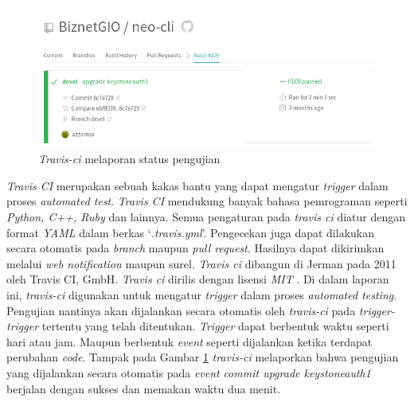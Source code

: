 \begin{figure}[H]
  \centering
  \includegraphics[width=.8\linewidth]{img/travis-head}
  \caption{\emph{Travis-ci} melaporan status pengujian}
  \label{fig:travis-head}
\end{figure}

\emph{Travis CI} merupakan sebuah kakas bantu yang dapat mengatur
\emph{trigger} dalam proses \emph{automated test}.  \emph{Travis CI}
mendukung banyak bahasa pemrograman seperti \emph{Python, C++, Ruby}
dan lainnya. Semua pengaturan pada \emph{travis ci} diatur dengan
format \emph{YAML} dalam berkas `\emph{.travis.yml}'. Pengecekan juga
dapat dilakukan secara otomatis pada \emph{branch} maupun \emph{pull
  request}. Hasilnya dapat dikirimkan melalui \emph{web notification}
maupun surel. \emph{Travis ci} dibangun di Jerman pada 2011 oleh
Travis CI, GmbH. \emph{Travis ci} dirilis dengan lisensi \emph{MIT}
\parencite{travis-ol}. Di dalam laporan ini, \emph{travis-ci}
digunakan untuk mengatur \emph{trigger} dalam proses \emph{automated
  testing}. Pengujian nantinya akan dijalankan secara otomatis oleh
\emph{travis-ci} pada \emph{trigger-trigger} tertentu yang telah
ditentukan. \emph{Trigger} dapat berbentuk waktu seperti hari atau
jam. Maupun berbentuk \emph{event} seperti dijalankan ketika terdapat
perubahan \emph{code}. Tampak pada Gambar \ref{fig:travis-head}
\emph{travis-ci} melaporkan bahwa pengujian yang dijalankan secara
otomatis pada \emph{event} \emph{commit upgrade keystoneauth1} berjalan
dengan sukses dan memakan waktu dua menit.


